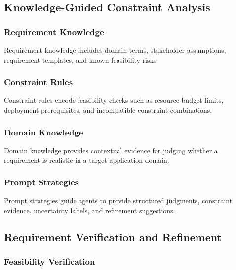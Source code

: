 \subsection{Knowledge-Guided Constraint Analysis}
\label{method:knowledge}

\subsubsection{Requirement Knowledge}
\label{method:requirement_knowledge}

Requirement knowledge includes domain terms, stakeholder assumptions, requirement templates, and known feasibility risks.

\subsubsection{Constraint Rules}
\label{method:constraint_rules}

Constraint rules encode feasibility checks such as resource budget limits, deployment prerequisites, and incompatible constraint combinations.

\subsubsection{Domain Knowledge}
\label{method:domain_knowledge}

Domain knowledge provides contextual evidence for judging whether a requirement is realistic in a target application domain.

\subsubsection{Prompt Strategies}
\label{method:prompt_strategies}

Prompt strategies guide agents to provide structured judgments, constraint evidence, uncertainty labels, and refinement suggestions.

\subsection{Requirement Verification and Refinement}
\label{method:verification_refinement}

\subsubsection{Feasibility Verification}
\label{method:feasibility_verification}

